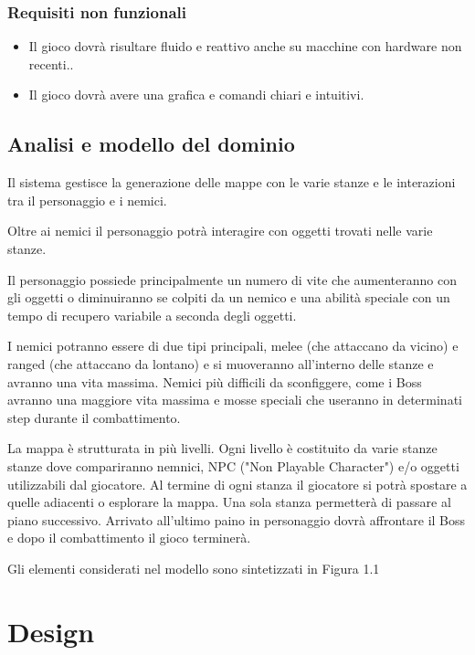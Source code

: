 \documentclass[a4paper,12pt]{report}
\begin{document}
	\subsection{Requisiti non funzionali}
	\begin{itemize}
		\item Il gioco dovrà risultare fluido e reattivo anche su macchine con hardware non recenti..
		\item Il gioco dovrà avere una grafica e comandi chiari e intuitivi.
	\end{itemize}
	\section{Analisi e modello del dominio}
	\par Il sistema gestisce la generazione delle mappe con le varie stanze e le interazioni tra il 
	personaggio e i nemici. 
	\par Oltre ai nemici il personaggio potrà interagire con oggetti trovati nelle varie stanze.
	\par Il personaggio possiede principalmente un numero di vite che aumenteranno con gli oggetti 
	o diminuiranno se colpiti da un nemico e una abilità speciale con un tempo di recupero variabile a seconda degli oggetti.
	\par I nemici potranno essere di due tipi principali, melee (che attaccano da vicino) e ranged (che attaccano da lontano) 
	e si muoveranno all'interno delle stanze e avranno una vita massima. Nemici più difficili da sconfiggere, 
	come i Boss avranno una maggiore vita massima e mosse speciali che useranno in determinati step durante il combattimento. 
	\par La mappa è strutturata in più livelli. Ogni livello è costituito da varie stanze stanze dove compariranno nemnici, 
	NPC ("Non Playable Character") e/o oggetti utilizzabili dal giocatore. Al termine di ogni stanza il giocatore si potrà 
	spostare a quelle adiacenti o esplorare la mappa. Una sola stanza permetterà di passare al piano successivo. 
	Arrivato all'ultimo paino in personaggio dovrà affrontare il Boss e dopo il combattimento il gioco terminerà. 
	\par \par Gli elementi considerati nel modello sono sintetizzati in Figura 1.1
	
	
	\chapter{Design}
\end{document}
